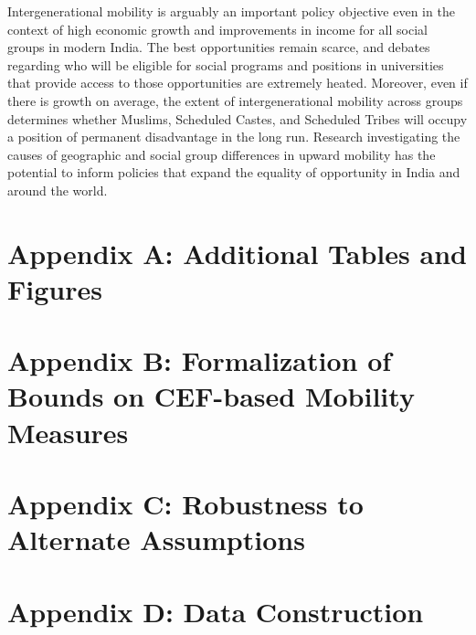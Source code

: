 \documentclass[12pt,letterpaper]{article}
\numberwithin{equation}{section}
\newcommand{\HOME}{\string~}
\begin{document}
Intergenerational mobility is arguably an important policy objective even in the context of high economic growth and improvements in income for all social groups in modern India. The best opportunities remain scarce, and debates regarding who will be eligible for social programs and positions in universities that provide access to those opportunities are extremely heated. Moreover, even if there is growth on average, the extent of intergenerational mobility across groups determines whether Muslims, Scheduled Castes, and Scheduled Tribes will occupy a position of permanent disadvantage in the long run. Research investigating the causes of geographic and social group differences in upward mobility has the potential to inform policies that expand the equality of opportunity in India and around the world.

\begin{appendix}
\pagestyle{fancy}
  \newpage

 {  \singlespace
  
  
}

  \newpage
  
  

  \section{Appendix A: Additional Tables and Figures}
  \setcounter{table}{0}
  \renewcommand{\thetable}{A\arabic{table}}
  \setcounter{figure}{0}
  \renewcommand{\thefigure}{A\arabic{figure}}

  
  
  
  \newpage

  {\normalsize

  \section{Appendix B: Formalization of Bounds on CEF-based Mobility Measures}
  \label{app:formal_model}
  \setcounter{table}{0}
  \renewcommand{\thetable}{B\arabic{table}}
  \setcounter{figure}{0}
  \renewcommand{\thefigure}{B\arabic{figure}}
  

  \newpage
    
  \section{Appendix C: Robustness to Alternate Assumptions}
  \label{app:robust}
  \setcounter{table}{0}
  \renewcommand{\thetable}{C\arabic{table}}
  \setcounter{figure}{0}
  \renewcommand{\thefigure}{C\arabic{figure}}
  

  \newpage
  \floatbarrier
  
  \section{Appendix D: Data Construction}
  \label{app:data}
  
}
\end{appendix}
\end{document}
